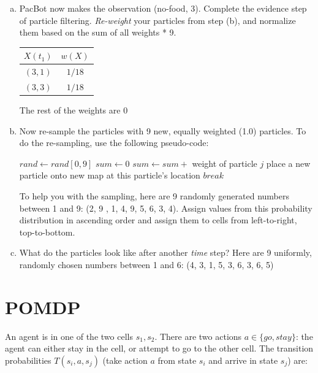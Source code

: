\documentclass[12pt]{article}
\begin{document}
\begin{enumerate}[a)]
\item PacBot now makes the observation (no-food, 3).  Complete the
    evidence step of particle filtering. \emph{Re-weight} your
    particles from step (b), and normalize them based on the sum of
    all weights * 9.

\begin{table}[H]
\centering
\begin{tabular}{c c}
\hline\hline
$X(t_{1})$ & $w(X)$\\
\hline
$(3,1)$ & $1/18$\\
$(3,3)$ & $1/18$\\
\hline
\end{tabular}
\end{table}

The rest of the weights are $0$


\item Now re-sample the particles with 9 new, equally weighted (1.0)
  particles.  To do the re-sampling, use the following
  pseudo-code:

   \begin{algorithmic}
      \STATE $rand \leftarrow rand[0,9]$
      \STATE $sum \leftarrow  0$
         \STATE $sum \leftarrow sum + $ weight of particle $j$
            \STATE place a new particle onto new map at this particle's location
            \STATE $break$
         \ENDIF
      \ENDFOR
   \ENDFOR
   \end{algorithmic}

   To help you with the sampling, here are 9 randomly generated
   numbers between 1 and 9: (2, 9 , 1, 4, 9, 5, 6, 3, 4). Assign
   values from this probability distribution in ascending order and
   assign them to cells from left-to-right, top-to-bottom.

\item{What do the particles look like after another \emph{time} step?
    Here are 9 uniformly, randomly chosen numbers between 1 and 6: (4,
    3, 1, 5, 3, 6, 3, 6, 5)}

\end{enumerate}

\clearpage

\section{POMDP}

An agent is in one of the two cells $s_1,s_2$.  There are two actions
$a \in \{ go, stay\}$: the agent can either stay in the cell, or
attempt to go to the other cell.  The transition probabilities
$T(s_i,a,s_j)$ (take action $a$ from state $s_i$ and arrive in state
$s_j$) are:
\end{document}

